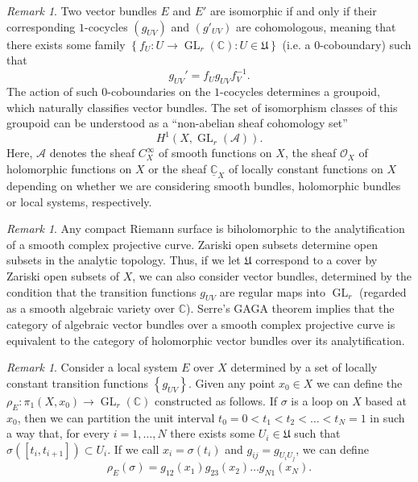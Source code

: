 \documentclass[12pt,a4paper]{amsbook}
\theoremstyle{remark} \newtheorem{rmk}[thm]{Remark}
\theoremstyle{definition} \newtheorem{defn}[thm]{Definition}
\theoremstyle{definition} \newtheorem{ex}[thm]{Example}
\theoremstyle{definition} \newtheorem{ej}{Exercise}
\let\emph\relax
\newcommand{\C}{\mathbb C}
\newcommand{\fU}{\mathfrak U}
\newcommand{\sO}{\mathscr O}
\DeclareMathOperator{\GL}{GL}
\begin{document}
\begin{rmk}
Two vector bundles $E$ and $E'$ are isomorphic if and only if their corresponding $1$-cocycles $(g_{UV})$ and $(g'_{UV})$ are cohomologous, meaning that there exists some family $\left\{f_U:U\rightarrow \GL_r(\C): U\in \fU \right\}$ (i.e. a $0$-coboundary) such that
\begin{equation*}
g_{UV}' = f_U g_{UV} f_V^{-1}.
\end{equation*} 
The action of such $0$-coboundaries on the $1$-cocycles determines a groupoid, which naturally classifies vector bundles. The set of isomorphism classes of this groupoid can be understood as a ``non-abelian sheaf cohomology set'' \[H^1(X,\GL_r(\mathscr{A})).\]  Here, $\mathscr{A}$ denotes the sheaf $C^\infty_X$ of smooth functions on $X$, the sheaf $\sO_X$ of holomorphic functions on $X$ or the sheaf $\underline{\C}_X$ of locally constant functions on $X$ depending on whether we are considering smooth bundles, holomorphic bundles or local systems, respectively.
\end{rmk}

\begin{rmk}
Any compact Riemann surface is biholomorphic to the analytification of a smooth complex projective curve. Zariski open subsets determine open subsets in the analytic topology. Thus, if we let $\fU$ correspond to a cover by Zariski open subsets of $X$, we can also consider \emph{algebraic} vector bundles, determined by the condition that the transition functions $g_{UV}$ are regular maps into $\GL_r$ (regarded as a smooth algebraic variety over $\C$). Serre's GAGA theorem \cite{GAGA} implies that the category of algebraic vector bundles over a smooth complex projective curve is equivalent to the category of holomorphic vector bundles over its analytification.
\end{rmk}

\begin{rmk}
Consider a local system $E$ over $X$ determined by a set of locally constant transition functions $\left\{g_{UV}\right\}$. Given any point $x_0\in X$ we can define the \emph{monodromy representation} $\rho_E:\pi_1(X,x_0)\rightarrow \GL_r(\C)$ constructed as follows. If $\sigma$ is a loop on $X$ based at $x_0$, then we can partition the unit interval $t_0=0<t_1<t_2<\dots<t_N=1$ in such a way that, for every $i=1,\dots,N$ there exists some  $U_i \in \fU$ such that $\sigma([t_i,t_{i+1}])\subset U_i$. If we call $x_i=\sigma(t_i)$ and $g_{ij}=g_{U_iU_j}$, we can define
\begin{equation*}
\rho_E(\sigma) = g_{12}(x_1) g_{23}(x_2) \dots g_{N1}(x_N).
\end{equation*} 
\end{rmk}
\end{document}
